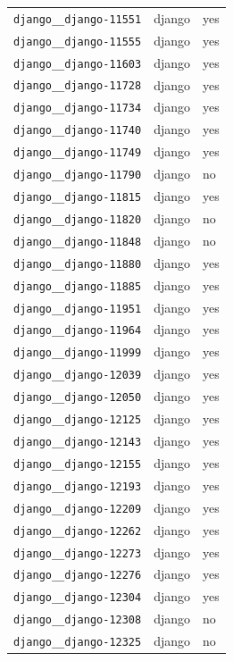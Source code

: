\begin{longtable}{@{}p{}lp{}@{}}
\texttt{django\_\_django-11551} & django & yes \\
\texttt{django\_\_django-11555} & django & yes \\
\texttt{django\_\_django-11603} & django & yes \\
\texttt{django\_\_django-11728} & django & yes \\
\texttt{django\_\_django-11734} & django & yes \\
\texttt{django\_\_django-11740} & django & yes \\
\texttt{django\_\_django-11749} & django & yes \\
\texttt{django\_\_django-11790} & django & no \\
\texttt{django\_\_django-11815} & django & yes \\
\texttt{django\_\_django-11820} & django & no \\
\texttt{django\_\_django-11848} & django & no \\
\texttt{django\_\_django-11880} & django & yes \\
\texttt{django\_\_django-11885} & django & yes \\
\texttt{django\_\_django-11951} & django & yes \\
\texttt{django\_\_django-11964} & django & yes \\
\texttt{django\_\_django-11999} & django & yes \\
\texttt{django\_\_django-12039} & django & yes \\
\texttt{django\_\_django-12050} & django & yes \\
\texttt{django\_\_django-12125} & django & yes \\
\texttt{django\_\_django-12143} & django & yes \\
\texttt{django\_\_django-12155} & django & yes \\
\texttt{django\_\_django-12193} & django & yes \\
\texttt{django\_\_django-12209} & django & yes \\
\texttt{django\_\_django-12262} & django & yes \\
\texttt{django\_\_django-12273} & django & yes \\
\texttt{django\_\_django-12276} & django & yes \\
\texttt{django\_\_django-12304} & django & yes \\
\texttt{django\_\_django-12308} & django & no \\
\texttt{django\_\_django-12325} & django & no \\

\end{longtable}
